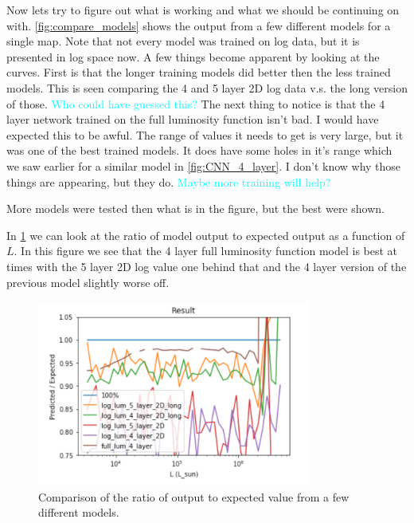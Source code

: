 \documentclass{article}
\newcommand{\dnp}[1]{\textcolor{cyan}{#1}}
\begin{document}
			Now lets try to figure out what is working and what we should be continuing on with.  \cref{fig:compare_models} shows the output from a few different models for a single map.  Note that not every model was trained on log data, but it is presented in log space now.  A few things become apparent by looking at the curves.  First is that the longer training models did better then the less trained models.  This is seen comparing the 4 and 5 layer 2D log data v.s. the long version of those.  \dnp{Who could have guessed this?}  The next thing to notice is that the 4 layer network trained on the full luminosity function isn't bad.  I would have expected this to be awful.  The range of values it needs to get is very large, but it was one of the best trained models.  It does have some holes in it's range which we saw earlier for a similar model in \cref{fig:CNN_4_layer}.  I don't know why those things are appearing, but they do.  \dnp{Maybe more training will help?}  

			More models were tested then what is in the figure, but the best were shown.

			In \cref{fig:compare_models_ratio} we can look at the ratio of model output to expected output as a function of \(L\).  In this figure we see that the 4 layer full luminosity function model is best at times with the 5 layer 2D log value one behind that and the 4 layer version of the previous model slightly worse off.

			\begin{figure}[H]
				\centering
				\includegraphics[width=0.8\textwidth]{compare_models_ratio.pdf}
				\caption{Comparison of the ratio of output to expected value from a few different models.}
				\label{fig:compare_models_ratio}
			\end{figure}
\end{document}
